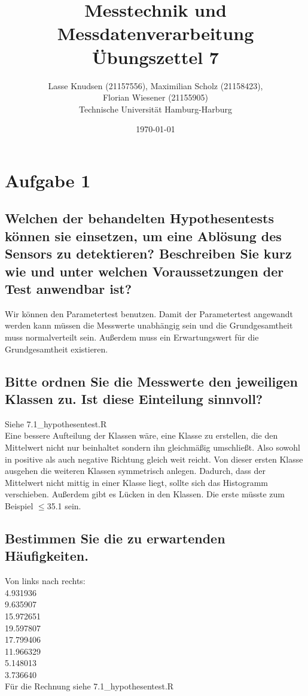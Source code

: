 \documentclass[12pt, a4paper, titlepage]{article}
\title{Messtechnik und Messdatenverarbeitung \\ \"Ubungszettel 7}
\author{Lasse Knudsen (21157556), Maximilian Scholz (21158423), \\
	Florian Wiesener (21155905)  \\
	Technische Universit\"at Hamburg-Harburg \\
}
\date{\today}
\begin{document}
	\maketitle
	 \section{Aufgabe 1}
	 \label{sec:a1}
	 
	\subsection{Welchen der behandelten Hypothesentests k\"onnen sie einsetzen, um eine Abl\"osung des Sensors zu
	 	detektieren? Beschreiben Sie kurz wie und unter welchen Voraussetzungen der Test anwendbar ist?}
	Wir k\"onnen den Parametertest benutzen. Damit der Parametertest angewandt werden kann m\"ussen die Messwerte unabh\"angig sein und die Grundgesamtheit muss normalverteilt sein. Au\ss erdem muss ein Erwartungswert f\"ur die Grundgesamtheit existieren.
	
	\subsection{Bitte ordnen Sie die Messwerte den jeweiligen Klassen zu. Ist diese Einteilung sinnvoll?}
	
	Siehe 7.1\_hypothesentest.R \\
	Eine bessere Aufteilung der Klassen w\"are, eine Klasse zu erstellen, die den Mittelwert nicht nur beinhaltet sondern ihn gleichm\"a\ss ig umschlie\ss t. Also sowohl in positive als auch negative Richtung gleich weit reicht. Von dieser ersten Klasse ausgehen die weiteren Klassen symmetrisch anlegen. Dadurch, dass der Mittelwert nicht mittig in einer Klasse liegt, sollte sich das Histogramm verschieben.
	Au\ss erdem gibt es L\"ucken in den Klassen. Die erste m\"usste zum Beispiel $\leq$35.1 sein.
	
	\subsection{Bestimmen Sie die zu erwartenden H\"aufigkeiten.}
	Von links nach rechts:\\
  4.931936 \\
  9.635907 \\
  15.972651 \\
  19.597807 \\
  17.799406 \\
  11.966329 \\
  5.148013 \\
  3.736640 \\
  F\"ur die Rechnung siehe 7.1\_hypothesentest.R
	
\end{document}
